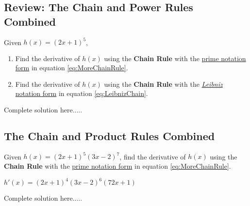 \subsection*{Review: The Chain and Power Rules Combined}
\begin{example}\label{exMoreChain1}
Given $h(x)=(2x+1)^5$,   
\renewcommand{\labelenumi}{\textbf{(\alph{enumi})}}
\begin{enumerate}[leftmargin=*]
    \item Find the derivative of $h(x)$ using the \textbf{Chain Rule} with the \underline{prime notation form} in equation \ref{eq:MoreChainRule}.\newpage
    \item Find the derivative of $h(x)$ using the \textbf{Chain Rule} with the \underline{\emph{Leibniz} notation form} in equation \ref{eq:LeibnizChain}.
\end{enumerate}
    \begin{sol}
    \end{sol}
    \begin{solL}
    Complete solution here.....
    
    \end{solL}
    
\end{example}

\subsection*{The Chain and Product Rules Combined}
\begin{example}
Given $h(x)=(2x+1)^5(3x-2)^7$, find the derivative of $h(x)$ using the \textbf{Chain Rule} with the \underline{prime notation form} in equation \ref{eq:MoreChainRule}.

    \begin{sol}
    $h'(x)=(2x+1)^4(3x-2)^6(72x+1)$
    \end{sol}
    \begin{solL}
    Complete solution here.....
    
    \end{solL}
    
\end{example}
\newpage
